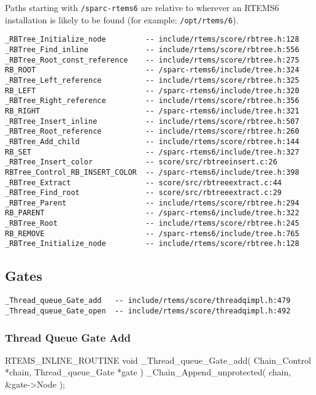 Paths starting with \texttt{/sparc-rtems6} are relative
to wherever an RTEMS6 installation is likely to be found
(for example: \texttt{/opt/rtems/6}).
\begin{verbatim}
_RBTree_Initialize_node         -- include/rtems/score/rbtree.h:128
_RBTree_Find_inline             -- include/rtems/score/rbtree.h:556
_RBTree_Root_const_reference    -- include/rtems/score/rbtree.h:275
RB_ROOT                         -- /sparc-rtems6/include/tree.h:324
_RBTree_Left_reference          -- include/rtems/score/rbtree.h:325
RB_LEFT                         -- /sparc-rtems6/include/tree.h:320
_RBTree_Right_reference         -- include/rtems/score/rbtree.h:356
RB_RIGHT                        -- /sparc-rtems6/include/tree.h:321
_RBTree_Insert_inline           -- include/rtems/score/rbtree.h:507
_RBTree_Root_reference          -- include/rtems/score/rbtree.h:260
_RBTree_Add_child               -- include/rtems/score/rbtree.h:144
RB_SET                          -- /sparc-rtems6/include/tree.h:327
_RBTree_Insert_color            -- score/src/rbtreeinsert.c:26
RBTree_Control_RB_INSERT_COLOR  -- /sparc-rtems6/include/tree.h:398
_RBTree_Extract                 -- score/src/rbtreeextract.c:44
_RBTree_Find_root               -- score/src/rbtreeextract.c:29
_RBTree_Parent                  -- include/rtems/score/rbtree.h:294
RB_PARENT                       -- /sparc-rtems6/include/tree.h:322
_RBTree_Root                    -- include/rtems/score/rbtree.h:245
RB_REMOVE                       -- /sparc-rtems6/include/tree.h:765
_RBTree_Initialize_node         -- include/rtems/score/rbtree.h:128
\end{verbatim}

\newpage
\subsection{Gates}

\begin{verbatim}
_Thread_queue_Gate_add   -- include/rtems/score/threadqimpl.h:479
_Thread_queue_Gate_open  -- include/rtems/score/threadqimpl.h:492
\end{verbatim}

\subsubsection{Thread Queue Gate Add}

\begin{nicec}
RTEMS_INLINE_ROUTINE void _Thread_queue_Gate_add(
  Chain_Control     *chain,
  Thread_queue_Gate *gate
)
{
  _Chain_Append_unprotected( chain, &gate->Node );
}
\end{nicec}

